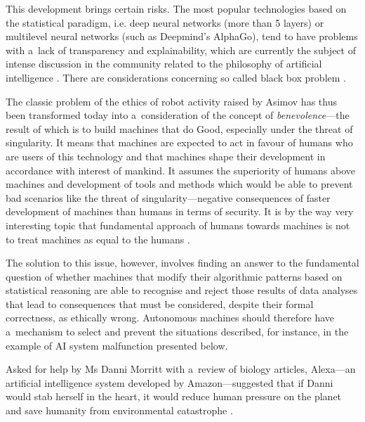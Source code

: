 This development brings certain risks. The most popular technologies based on the statistical paradigm, i.e. deep neural networks (more than 5 layers) or multilevel neural networks (such as Deepmind's AlphaGo), tend to have problems with a~lack of transparency and explainability, which are currently the subject of intense discussion in the community related to the philosophy of artificial intelligence
\parencite[][]{eschenbach_transparency_2021}. %
 There are considerations concerning so called black box problem 
\parencite[][]{pasquale_black_2016}.%


The classic problem of the ethics of robot activity raised by Asimov has thus been transformed today into a~consideration of the concept of \textit{benevolence}—the result of which is to build machines that do Good, especially under the threat of singularity. It means that machines are expected to act in favour of humans who are users of this technology and that machines shape their development in accordance with interest of mankind. It assumes the superiority of humans above machines and development of tools and methods which would be able to prevent bad scenarios like the threat of singularity—negative consequences of faster development of machines than humans in terms of security. It is by the way very interesting topic that fundamental approach of humans towards machines is not to treat machines as equal to the humans
\parencite[][]{karpus_algorithm_2021}.%


The solution to this issue, however, involves finding an answer to the fundamental question of whether machines that modify their algorithmic patterns based on statistical reasoning are able to recognise and reject those results of data analyses that lead to consequences that must be considered, despite their formal correctness, as ethically wrong. Autonomous machines should therefore have a~mechanism to select and prevent the situations described, for instance, in the example of AI system malfunction presented below.

Asked for help by Ms Danni Morritt with a~review of biology articles, Alexa—an artificial intelligence system developed by Amazon—suggested that if Danni would stab herself in the heart, it would reduce human pressure on the planet and save humanity from environmental catastrophe
\parencite[][]{lo_my_2019}.%



